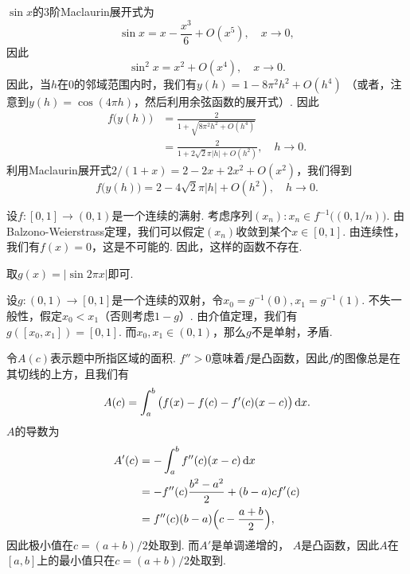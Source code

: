\begin{ans}
  $\sin x$的3阶Maclaurin展开式为
  \[ \sin x=x-\frac{x^3}6+O(x^5),\quad x\to0, \]
  因此
  \[ \sin^2x = x^2+O(x^4),\quad x\to0. \]
  因此，当$h$在$0$的邻域范围内时，我们有$y(h)=1-8\pi^2h^2+O(h^4)$ （或者，注意到$y(h)=\cos(4\pi h)$，然后利用余弦函数的展开式）. 因此
  \begin{align*}
    f\big(y(h)\big) & = \frac2{1+\sqrt{8\pi^2h^2+O(h^4)}} \\
       & = \frac2{1+2\sqrt2\pi|h|+O(h^2)},\quad h\to0.
  \end{align*}
  利用Maclaurin展开式$2/(1+x)=2-2x+2x^2+O(x^2)$，我们得到
  \[ f\big(y(h)\big)=2-4\sqrt2\pi|h|+O(h^2),\quad h\to0. \]
\end{ans}

\begin{ans}
  \begin{enumb}
    \item 设$f:[0,1]\to(0,1)$是一个连续的满射. 考虑序列$(x_n):x_n\in f^{-1}\big((0,1/n)\big)$. 由Balzono-Weierstrass定理，我们可以假定$(x_n)$收敛到某个$x\in[0,1]$. 由连续性，我们有$f(x)=0$，这是不可能的. 因此，这样的函数不存在.
    \item 取$g(x)=|\sin2\pi x|$即可.
    \item 设$g:(0,1)\to[0,1]$是一个连续的双射，令$x_0=g^{-1}(0),x_1=g^{-1}(1)$. 不失一般性，假定$x_0<x_1$（否则考虑$1-g$）. 由介值定理，我们有$g([x_0,x_1])=[0,1]$. 而$x_0,x_1\in(0,1)$，那么$g$不是单射，矛盾.
  \end{enumb}
\end{ans}

\begin{ans}
  令$A(c)$表示题中所指区域的面积. $f''>0$意味着$f$是凸函数，因此$f$的图像总是在其切线的上方，且我们有
  \[ A(c)=\int_a^b\big( f(x)-f(c)-f'(c)(x-c)\big)\,\mathrm dx. \]
  $A$的导数为
  \begin{align*}
    A'(c) & = - \int_a^b f''(c)(x-c)\,\mathrm dx\\
          & = -f''(c)\frac{b^2-a^2}2 +(b-a)cf'(c)\\
          & = f''(c)(b-a)\Big( c-\frac{a+b}2 \Big),
  \end{align*}
  因此极小值在$c=(a+b)/2$处取到. 而$A'$是单调递增的， $A$是凸函数，因此$A$在$[a,b]$上的最小值只在$c=(a+b)/2$处取到.
\end{ans}

